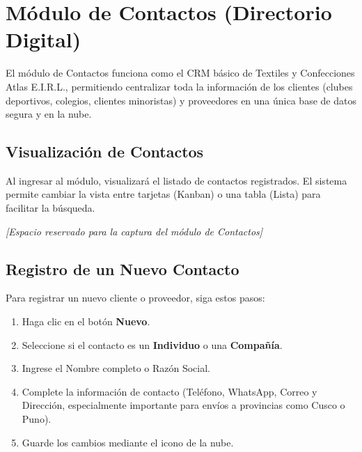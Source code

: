 \section{Módulo de Contactos (Directorio Digital)}

El módulo de Contactos funciona como el CRM básico de Textiles y Confecciones Atlas E.I.R.L., permitiendo centralizar toda la información de los clientes (clubes deportivos, colegios, clientes minoristas) y proveedores en una única base de datos segura y en la nube.

\subsection{Visualización de Contactos}

Al ingresar al módulo, visualizará el listado de contactos registrados. El sistema permite cambiar la vista entre tarjetas (Kanban) o una tabla (Lista) para facilitar la búsqueda.

\vspace{1cm}
\begin{center}
\textit{[Espacio reservado para la captura del módulo de Contactos]}
\end{center}
\vspace{1cm}

\subsection{Registro de un Nuevo Contacto}

Para registrar un nuevo cliente o proveedor, siga estos pasos:
\begin{enumerate}
    \item Haga clic en el botón \textbf{Nuevo}.
    \item Seleccione si el contacto es un \textbf{Individuo} o una \textbf{Compañía}.
    \item Ingrese el Nombre completo o Razón Social.
    \item Complete la información de contacto (Teléfono, WhatsApp, Correo y Dirección, especialmente importante para envíos a provincias como Cusco o Puno).
    \item Guarde los cambios mediante el icono de la nube.
\end{enumerate}
